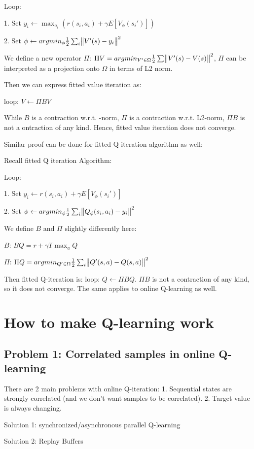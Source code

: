 \documentclass{article}
\begin{document}
Loop:

1. Set $y_i \leftarrow \max_{a_i}(r(s_i, a_i)+ \gamma E[V_{\phi}(s_i')])$

2. Set $\phi \leftarrow argmin_{\phi} \frac{1}{2} \sum_i \norm{V'(s) - y_i}^2$

We define a new operator $\Pi$: $\Pi V = argmin_{V' \in \Omega} \frac{1}{2} \sum \norm{V'(s) - V(s)}^2$, $\Pi$ can be interpreted as a projection onto $\Omega$ in terms of L2 norm.

Then we can express fitted value iteration as: 

loop: $V \leftarrow \Pi BV$

While $B$ is a contraction w.r.t. \infty-norm, $\Pi$ is a contraction w.r.t. L2-norm, $\Pi B$ is not a ontraction of any kind. Hence, fitted value iteration does not converge.

Similar proof can be done for fitted Q iteration algorithm as well:

Recall fitted Q iteration Algorithm:

Loop:

1. Set $y_i \leftarrow r(s_i, a_i) + \gamma E[V_{\phi}(s_i')]$

2. Set $\phi \leftarrow argmin_{\phi} \frac{1}{2} \sum_i \norm{Q_{\phi}(s_i, a_i) - y_i}^2$

We define $B$ and $\Pi$ slightly differently here: 

$B$: $BQ = r + \gamma T \max_a Q$

$\Pi$: $\Pi Q = argmin_{Q' \in \Omega} \frac{1}{2} \sum_i \norm{Q'(s,a) - Q(s,a)}^2$

Then fitted Q-iteration is: loop: $Q \leftarrow \Pi BQ$. $\Pi B$ is not a contraction of any kind, so it does not converge. The same applies to online Q-learning as well.


\section{How to make Q-learning work}
\subsection{Problem 1: Correlated samples in online Q-learning}
There are 2 main problems with online Q-iteration: 
1. Sequential states are strongly correlated (and we don't want samples to be correlated). 2. Target value is always changing.

Solution 1: synchronized/asynchronous parallel Q-learning

Solution 2: Replay Buffers
\end{document}
